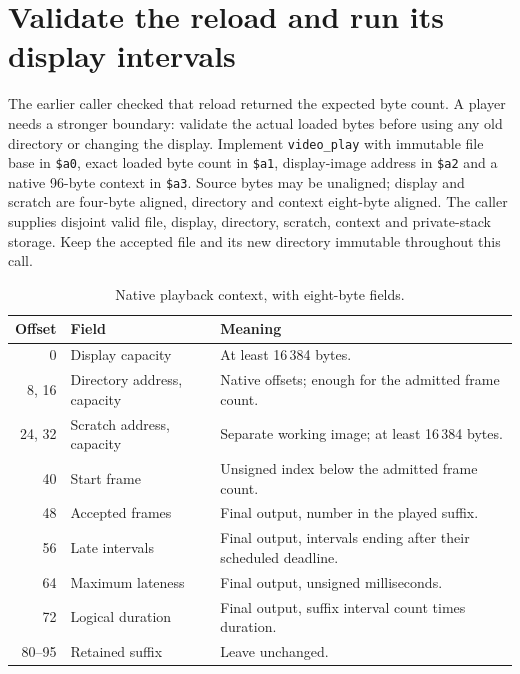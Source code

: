 \section{Validate the reload and run its display intervals}
The earlier caller checked that reload returned the expected byte count. A player
needs a stronger boundary: validate the actual loaded bytes before using any old
directory or changing the display. Implement \texttt{video\_play} with immutable
file base in \texttt{\$a0}, exact loaded byte count in \texttt{\$a1}, display-image
address in \texttt{\$a2} and a native 96-byte context in \texttt{\$a3}. Source
bytes may be unaligned; display and scratch are four-byte aligned, directory and
context eight-byte aligned. The caller supplies disjoint valid file, display,
directory, scratch, context and private-stack storage. Keep the accepted file and
its new directory immutable throughout this call.

\begin{table}[htbp]
  \centering
  \caption{Native playback context, with eight-byte fields.}
  \label{tab:video-playback-context}
  \begin{tabular}{r p{1.5in} p{2.8in}}
    \toprule
    Offset & Field                       & Meaning                                                        \\
    \midrule
    0      & Display capacity            & At least 16\,384 bytes.                                        \\
    8, 16  & Directory address, capacity & Native offsets; enough for the admitted frame count.           \\
    24, 32 & Scratch address, capacity   & Separate working image; at least 16\,384 bytes.                \\
    40     & Start frame                 & Unsigned index below the admitted frame count.                 \\
    48     & Accepted frames             & Final output, number in the played suffix.                     \\
    56     & Late intervals              & Final output, intervals ending after their scheduled deadline. \\
    64     & Maximum lateness            & Final output, unsigned milliseconds.                           \\
    72     & Logical duration            & Final output, suffix interval count times duration.            \\
    80--95 & Retained suffix             & Leave unchanged.                                               \\
    \bottomrule
  \end{tabular}
\end{table}

